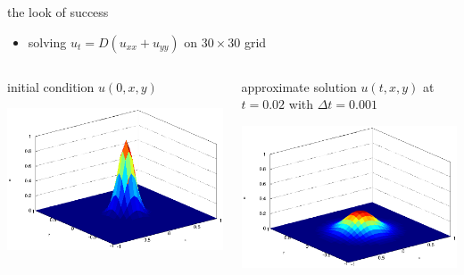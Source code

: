 \begin{frame}{the look of success}

\begin{itemize}
\item solving $u_t = D(u_{xx} + u_{yy})$ on $30\times 30$ grid
\end{itemize}

\bigskip\bigskip
\begin{columns}
\begin{column}{0.5\textwidth}
initial condition $u(0,x,y)$

\bigskip
\begin{center}
\includegraphics[width=1.2\textwidth]{pdffigs/initialheat}
\end{center}
\end{column}
\begin{column}{0.5\textwidth}
approximate solution $u(t,x,y)$ at $t=0.02$ with $\Delta t=0.001$ 

\bigskip
\begin{center}
\includegraphics[width=1.2\textwidth]{pdffigs/finalheat}
\end{center}
\end{column}
\end{columns}
\end{frame}


